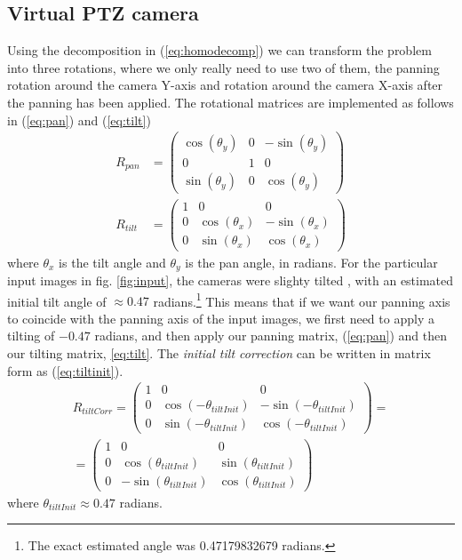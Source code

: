 \subsection{Virtual PTZ camera}
Using the decomposition in (\ref{eq:homodecomp}) we can transform the problem into three rotations, where we only really need to use two of them, the panning rotation around the camera Y-axis and rotation around the camera X-axis after the panning has been applied.
The rotational matrices are implemented as follows in (\ref{eq:pan}) and (\ref{eq:tilt})
	\begin{align}
		R_{pan}&=\begin{pmatrix}
			\cos(\theta_y) & 0 & -\sin(\theta_y) \\
			0 & 1 & 0 \\
			\sin(\theta_y) & 0 & \cos(\theta_y)
		\end{pmatrix} \label{eq:pan} \\
		R_{tilt} &=\begin{pmatrix}
			1 & 0 & 0 \\
			0 & \cos(\theta_x) & -\sin(\theta_x) \\
			0 & \sin(\theta_x) & \cos(\theta_x)
		\end{pmatrix} \label{eq:tilt}
	\end{align}
	where $\theta_x$ is the tilt angle and $\theta_y$ is the pan angle, in radians.
	For the particular input images in fig. \ref{fig:input}, the cameras were slighty tilted , with an estimated initial tilt angle of $\approx 0.47$ radians.\footnote{The exact estimated angle was 0.47179832679 radians.}
	This means that if we want our panning axis to coincide with the panning axis of the input images, we first need to apply a tilting of $-0.47$ radians, and then apply our panning matrix, (\ref{eq:pan}) and then our tilting matrix, \ref{eq:tilt}.
        The {\it initial tilt correction} can be written in matrix form as (\ref{eq:tiltinit}).
	\begin{multline}
		R_{tiltCorr}=\begin{pmatrix}
			1 & 0 & 0 \\
			0 & \cos(-\theta_{tiltInit}) & -\sin(-\theta_{tiltInit}) \\
			0 & \sin(-\theta_{tiltInit}) & \cos(-\theta_{tiltInit})
		\end{pmatrix} = \\
		=\begin{pmatrix}
			1 & 0 & 0 \\
			0 & \cos(\theta_{tiltInit}) & \sin(\theta_{tiltInit}) \\
			0 & -\sin(\theta_{tiltInit}) & \cos(\theta_{tiltInit})
		\end{pmatrix}
		\label{eq:tiltinit}
	\end{multline}
	where $\theta_{tiltInit} \approx 0.47$ radians.

